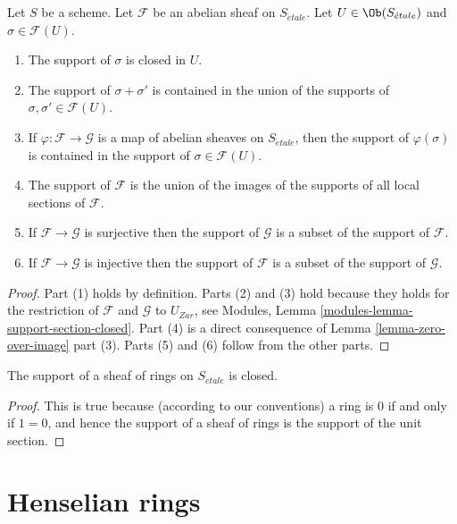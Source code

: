 \begin{lemma}
\label{lemma-support-section-closed}
Let $S$ be a scheme.
Let $\mathcal{F}$ be an abelian sheaf on $S_{\acute{e}tale}$.
Let $U \in \Ob(S_{\acute{e}tale})$ and $\sigma \in \mathcal{F}(U)$.
\begin{enumerate}
\item The support of $\sigma$ is closed in $U$.
\item The support of $\sigma + \sigma'$ is contained in the union of
the supports of $\sigma, \sigma' \in \mathcal{F}(U)$.
\item If $\varphi : \mathcal{F} \to \mathcal{G}$ is a map of
abelian sheaves on $S_{\acute{e}tale}$, then the support of $\varphi(\sigma)$
is contained in the support of $\sigma \in \mathcal{F}(U)$.
\item The support of $\mathcal{F}$ is the union of the images of the
supports of all local sections of $\mathcal{F}$.
\item If $\mathcal{F} \to \mathcal{G}$ is surjective then the support
of $\mathcal{G}$ is a subset of the support of $\mathcal{F}$.
\item If $\mathcal{F} \to \mathcal{G}$ is injective then the support
of $\mathcal{F}$ is a subset of the support of $\mathcal{G}$.
\end{enumerate}
\end{lemma}

\begin{proof}
Part (1) holds by definition.
Parts (2) and (3) hold because they holds for the restriction of
$\mathcal{F}$ and $\mathcal{G}$ to $U_{Zar}$, see
Modules, Lemma \ref{modules-lemma-support-section-closed}.
Part (4) is a direct consequence of
Lemma \ref{lemma-zero-over-image} part (3).
Parts (5) and (6) follow from the other parts.
\end{proof}

\begin{lemma}
\label{lemma-support-sheaf-rings-closed}
The support of a sheaf of rings on $S_{\acute{e}tale}$ is closed.
\end{lemma}

\begin{proof}
This is true because (according to our conventions)
a ring is $0$ if and only if
$1 = 0$, and hence the support of a sheaf of rings
is the support of the unit section.
\end{proof}




\section{Henselian rings}
\label{section-henselian-ring}

